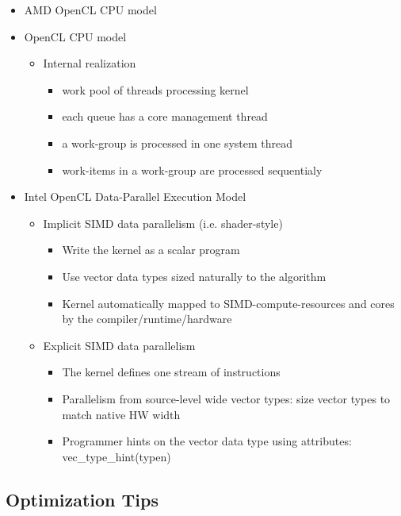 \documentclass[paper=a4, fontsize=11pt]{scrartcl} %
\numberwithin{equation}{section} %
\numberwithin{figure}{section} %
\numberwithin{table}{section} %
\begin{document}
\begin{itemize}
  \item AMD OpenCL CPU model
  \item OpenCL CPU model
  \begin{itemize}
    \item Internal realization
    \begin{itemize}
      \item work pool of threads processing kernel
      \item each queue has a core management thread
      \item a work-group is processed in one system thread
      \item work-items in a work-group are processed sequentialy
    \end{itemize}
  \end{itemize}
  \item Intel OpenCL Data-Parallel Execution Model
  \begin{itemize}
    \item Implicit SIMD data parallelism (i.e. shader-style)
    \begin{itemize}
      \item Write the kernel as a scalar program
      \item Use vector data types sized naturally to the algorithm
      \item Kernel automatically mapped to SIMD-compute-resources and cores by the compiler/runtime/hardware
    \end{itemize}
    \item Explicit SIMD data parallelism
    \begin{itemize}
      \item The kernel defines one stream of instructions
      \item Parallelism from source-level wide vector types: size vector types to match native HW width
      \item Programmer hints on the vector data type using attributes: vec_type_hint(typen)
    \end{itemize}
  \end{itemize}
\end{itemize}

\subsection{Optimization Tips}
\end{document}
